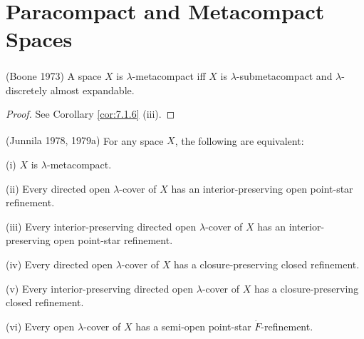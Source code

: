 \documentclass[ch4.tex]{subfiles}
\begin{document}
	
	
\section{Paracompact and Metacompact Spaces} \label{sec:4-2}

{\theorem{} \label{th:4.2.1}
\textup{(\hstretch{1.8}{[}Boone 1973\hstretch{1.8}{]}\textsuperscript{\cite{Boone}})}
A space $X$ is $\lambda$-metacompact iff $X$ is $\lambda$-submetacompact and $\lambda$-discretely almost expandable.
}

\begin{proof}
See Corollary \ref{cor:7.1.6} (iii).
\end{proof}

{\theorem{} \label{th:4.2.2}
\textup{(\hstretch{1.8}{[}Junnila 1978, 1979a\hstretch{1.8}{]}\textsuperscript{\cite{Junnila1978}\cite{Junnila1979a}})}
For any space $X$, the following are equivalent:

\textup{(i)} $X$ is $\lambda$-metacompact.

\textup{(ii)} Every directed open $\lambda$-cover of $X$ has an interior-preserving 
open  point-star refinement.

\textup{(iii)} Every interior-preserving directed open $\lambda$-cover of $X$ has an interior-preserving
open  point-star refinement.

\textup{(iv)} Every  directed open $\lambda$-cover of $X$ has a closure-preserving closed refinement.

\textup{(v)}  Every interior-preserving  directed open $\lambda$-cover of $X$ has a closure-preserving
closed refinement.

\textup{(vi)} Every open $\lambda$-cover of $X$ has a semi-open point-star $\dot{F}$-refinement.
}
\end{document}

